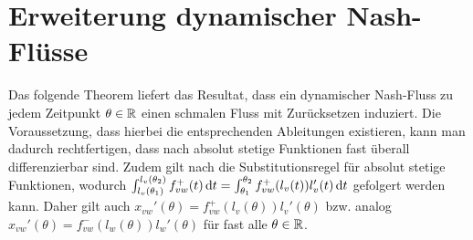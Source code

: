 \section{Erweiterung dynamischer Nash-Flüsse}\label{sec-nash-flow-extension}

Das folgende Theorem liefert das Resultat, dass ein dynamischer Nash-Fluss zu jedem Zeitpunkt $\theta\in\mathbb{R}$ einen schmalen Fluss mit Zurücksetzen induziert.
Die Voraussetzung, dass hierbei die entsprechenden Ableitungen existieren, kann man dadurch rechtfertigen, dass nach \cite[Folgerung~4.12~b)]{Elstrodt2011Abs} absolut stetige Funktionen fast überall differenzierbar sind.
Zudem gilt nach \cite[Aufgabe~4.10]{Elstrodt2011Abs} die Substitutionsregel für absolut stetige Funktionen, wodurch $\int_{l_v(\theta_1)}^{l_v(\theta_2)} f_{vw}^+(t) \mathop{}\!\mathrm{d} t = \int_{\theta_1}^{\theta_2} f_{vw}^+(l_v(t)) l_v'(t) \mathop{}\!\mathrm{d} t$ gefolgert werden kann.
Daher gilt auch $x_{vw}'(\theta) = f_{vw}^+(l_v(\theta))l_v'(\theta)$ bzw. analog $x_{vw}'(\theta) = f_{vw}^-(l_w(\theta)) l_w'(\theta)$ für fast alle $\theta\in\mathbb{R}$.


